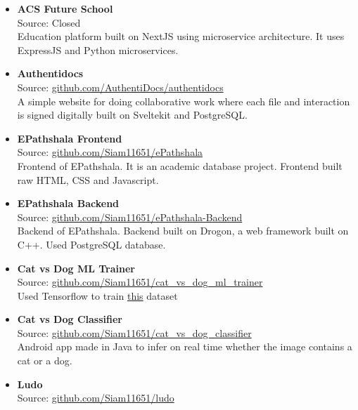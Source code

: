 
\begin{itemize}
  \item {
    \textbf{ACS Future School} \\
    Source: Closed \\
    Education platform built on NextJS using microservice architecture. It uses ExpressJS and Python microservices.
  }
  \item {
      \textbf{Authentidocs} \\
      Source: \href{https://github.com/AuthentiDocs/authentidocs}{github.com/AuthentiDocs/authentidocs} \\
      A simple website for doing collaborative work where each file and interaction is signed digitally built on Sveltekit and PostgreSQL.
    }
  \item {
    \textbf{EPathshala Frontend} \\
    Source: \href{https://github.com/Siam11651/ePathshala}{github.com/Siam11651/ePathshala} \\
    Frontend of EPathshala. It is an academic database project. Frontend built raw HTML, CSS and Javascript.
  }
  \item {
    \textbf{EPathshala Backend} \\
    Source: \href{https://github.com/Siam11651/ePathshala-Backend}{github.com/Siam11651/ePathshala-Backend} \\
    Backend of EPathshala. Backend built on Drogon, a web framework built on C++. Used PostgreSQL database.
  }
  \item {
      \textbf{Cat vs Dog ML Trainer} \\
      Source: \href{https://github.com/Siam11651/cat_vs_dog_ml_trainer}{github.com/Siam11651/cat\_vs\_dog\_ml\_trainer} \\
      Used Tensorflow to train \href{https://www.kaggle.com/competitions/dogs-vs-cats}{this} dataset
    }
  \item {
    \textbf{Cat vs Dog Classifier} \\
    Source: \href{https://github.com/Siam11651/cat_vs_dog_classifier}{github.com/Siam11651/cat\_vs\_dog\_classifier} \\
    Android app made in Java to infer on real time whether the image contains a cat or a dog.
  }
  \item {
    \textbf{Ludo} \\
    Source: \href{https://github.com/Siam11651/ludo}{github.com/Siam11651/ludo} \\
}
\end{itemize}
